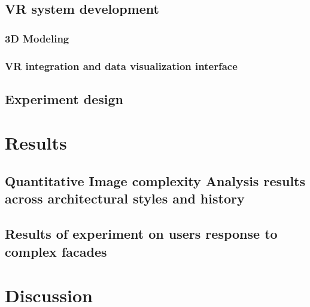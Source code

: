 \documentclass[final,5p,times]{elsarticle}
\begin{document}
\begin{linenumbers}
    \subsection{VR system development}
    \label{subsec:VRsystemDevelopment}
    

    \subsubsection{3D Modeling}
    \label{subsubsec:Modeling}
    

     \subsubsection{VR integration and data visualization interface}
    \label{subsubsec:VR_integration}
    

    \subsection{Experiment design}
    \label{subsec:Experiment_design}
    

\section{Results}
\label{sec:Results}


    \subsection{Quantitative Image complexity Analysis results across architectural styles and history}
    \label{subsec:ResultsComplexityImageAnalysishistory}
    

    \subsection{Results of experiment on users response to complex facades}
    \label{subsec:ResultsExperiment}
    

\section{Discussion}
\label{sec:Discussion}



\end{linenumbers}
\end{document}
